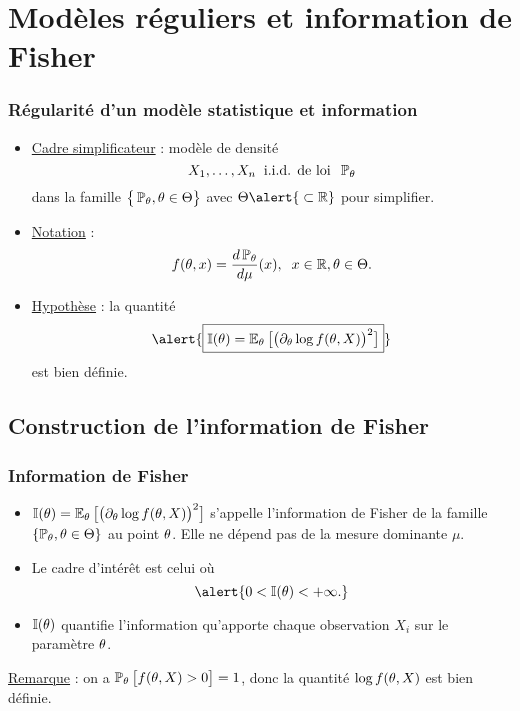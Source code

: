 \section{Modèles réguliers et information de Fisher}

\begin{frame}
\frametitle{Régularité d'un modèle statistique et information}
\begin{itemize}
\item \underline{Cadre simplificateur} : modèle de densité
$$X_1,\ldots, X_n\;\;\text{i.i.d. de loi}\;\; \operatorname{{\mathbb P}}_\theta$$
dans la famille $\big\{\operatorname{{\mathbb P}}_\theta, \theta \in \Theta\big\}$ avec $\Theta \alert{\; \subset \R}$ pour simplifier.
\item \underline{Notation} :
$$f(\theta, x) = \frac{d\operatorname{{\mathbb P}}_\theta}{d\mu}(x),\;\;x\in \operatorname{{\mathbb R}},\theta \in \Theta.$$
\item \underline{\alert{Hypothèse}} : la quantité
$$\alert{\boxed{{\mathbb I}(\truetheta) = \E_\truetheta\big[\big(\partial_\truetheta \log f(\truetheta, X)\big)^2\big]}}$$
est bien définie.
\end{itemize}
\end{frame}

\subsection{Construction de l'information de Fisher}

\begin{frame}
\frametitle{Information de Fisher}
\begin{df}
\begin{itemize}
\item $\mathbb{I}(\theta) = \operatorname{{\mathbb E}}_\theta\big[\big(\partial_\theta \log f(\theta, X)\big)^2\big]$ s'appelle \alert{l'information de Fisher} de la famille $\{\operatorname{{\mathbb P}}_\theta,\theta \in \Theta\}$ au point $\theta$. Elle ne dépend pas de la mesure dominante $\mu$.
\item Le cadre d'intérêt est celui où
$$\alert{0 < \mathbb{I}(\truetheta)< +\infty.}$$
\item $\mathbb{I}(\theta)$ quantifie  l'information  qu'apporte chaque observation $X_i$ sur le paramètre $\theta$.
\end{itemize}
\end{df}
\underline{Remarque} : on a $\operatorname{{\mathbb P}}_\theta\big[f(\theta, X)>0\big]=1$, donc la quantité $\log f(\theta, X)$ est bien définie.
\end{frame}

